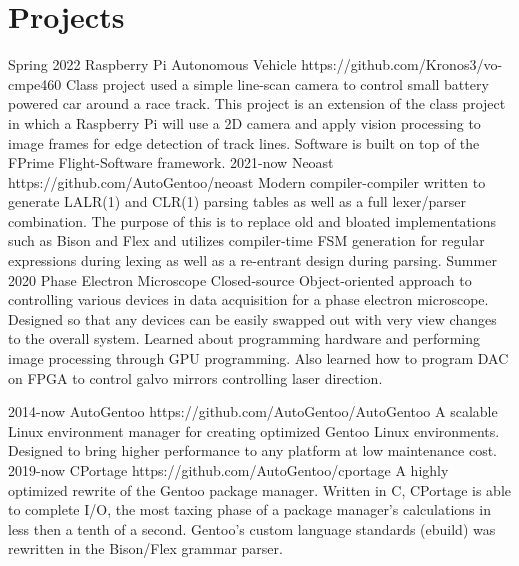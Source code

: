\documentclass[print]{cv-style}          %
\begin{document}

{\vspace{-0.3cm}}
\section{Projects}

\begin{entrylist}
\entry
{Spring 2022}
{Raspberry Pi Autonomous Vehicle}
{https://github.com/Kronos3/vo-cmpe460}
{Class project used a simple line-scan camera to control small battery powered car around
a race track. This project is an extension of the class project in which a Raspberry
Pi will use a 2D camera and apply vision  processing to image frames for edge detection
of track lines. Software is built on top of the FPrime Flight-Software framework.}
\entry
{2021-now}
{Neoast}
{https://github.com/AutoGentoo/neoast}
{Modern compiler-compiler written to generate LALR(1) and CLR(1) parsing tables as well
as a full lexer/parser combination. The purpose of this is to replace old and bloated
implementations such as Bison and Flex and utilizes compiler-time FSM generation for
regular expressions during lexing as well as a re-entrant design during parsing.}
\entry
{Summer 2020}
{Phase Electron Microscope}
{Closed-source}
{Object-oriented approach to controlling various devices in data acquisition for a phase electron microscope. Designed so that any devices can be easily swapped out with very view changes to the overall system. Learned about programming hardware and performing image processing through GPU programming. Also learned how to program DAC on FPGA to control galvo mirrors controlling laser direction.}
\end{entrylist}
\begin{entrylist}
\entry
{2014-now}
{AutoGentoo }
{https://github.com/AutoGentoo/AutoGentoo}
{A scalable Linux environment manager for creating optimized Gentoo Linux environments. Designed to bring higher performance to any platform at low maintenance cost.
}
\entry
{2019-now}
{CPortage}
{https://github.com/AutoGentoo/cportage}
{A highly optimized rewrite of the Gentoo package manager. Written in C, CPortage is able to complete I/O, the most taxing phase of a package manager's calculations in less then a tenth of a second. Gentoo's custom language standards (ebuild) was rewritten in the Bison/Flex grammar parser.}

{\vspace{-0.3cm}}
\end{entrylist}
\end{document}
